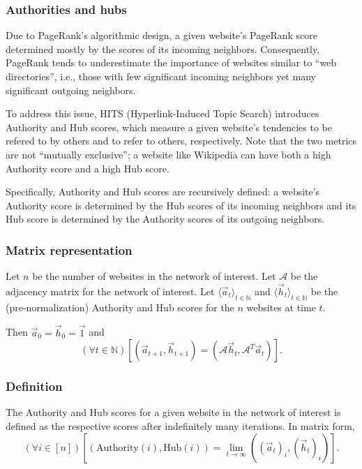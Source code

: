\documentclass[12pt, titlepage, twoside]{amsart}
\newcommand{\N}{\ensuremath{\mathbb N}}
\begin{document}
\subsubsection{Authorities and hubs}

Due to PageRank's algorithmic design, a given website's PageRank score determined mostly by the scores of its
incoming neighbors.
Consequently, PageRank tends to underestimate the importance of websites similar to ``web directories'', i.e., those
with few significant incoming neighbors yet many significant outgoing neighbors.

To address this issue, HITS (Hyperlink-Induced Topic Search) introduces Authority and Hub scores, which measure
a given website's tendencies to be refered to by others and to refer to others, respectively.
Note that the two metrics are not ``mutually exclusive''; a website like Wikipedia can have both a high Authority score
and a high Hub score.

Specifically, Authority and Hub scores are recursively defined: a website's Authority score is determined by
the Hub scores of its incoming neighbors and its Hub score is determined by the Authority scores of its outgoing
neighbors.~\cite{hits}~\cite{tanase}

\subsubsection{Matrix representation}

Let $n$ be the number of websites in the network of interest.
Let $\mathcal{A}$ be the adjacency matrix for the network of interest.
Let $\langle\vec{a}_t\rangle_{t\in\N}$ and $\langle\vec{h}_t\rangle_{t\in\N}$ be the (pre-normalization)
Authority and Hub scores for the $n$ websites at time $t$.

Then $\vec{a}_0 = \vec{h}_0 = \vec{1}$ and
\[
  (\forall t\in\N)
  \left[
    \left(\vec{a}_{t + 1}, \vec{h}_{t + 1}\right) = \left(\mathcal{A}\vec{h}_t, \mathcal{A}^T\vec{a}_t\right)
  \right].
\]

\subsubsection{Definition} The Authority and Hub scores for a given website in the network of interest is defined
as the respective scores after indefinitely many iterations.
In matrix form,
\[
  (\forall i\in[n])
  \left[
    \left(\mathrm{Authority}(i), \mathrm{Hub}(i)\right) =
    \lim_{t\to\infty}
    \left((\vec{a}_t)_i, (\vec{h}_t)_i\right)
  \right].
\]
\end{document}
